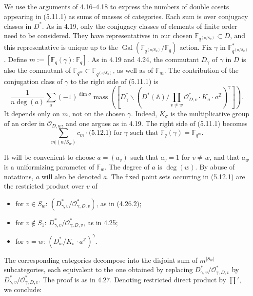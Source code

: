 \documentclass[11pt,a4paper]{article}
\theoremstyle{plain}
\theoremstyle{definition}
\DeclareMathOperator{\Gal}{Gal}
\DeclareMathOperator{\mass}{mass}
\newcommand{\Fq}{\mathbb{F}_q}
\newcommand{\F}{\mathbb{F}}
\newcommand{\Z}{\mathbb{Z}}
\begin{document}
\subsection{}
We use the arguments of 4.16--4.18 to express the numbers of double cosets appearing in (5.11.1) as sums of masses of categories. Each sum is over conjugacy classes in $D^*$. As in 4.19, only the conjugacy classes of elements of finite order need to be considered. They have representatives in our chosen $\F_{q^{(n/S_w)}} \subset D$, and this representative is unique up to the $\Gal(\F_{q^{(n/S_w)}}/\Fq)$ action. Fix $\gamma$ in $\F_{q^{(n/S_w)}}^*$. Define $m := [\F_q(\gamma) : \Fq]$. As in 4.19 and 4.24, the commutant $D_\gamma$ of $\gamma$ in $D$ is also the commutant of $\F_{q^m} \subset \F_{q^{(n/S_w)}}$, as well as of $\mathbb{F}_m$. The contribution of the conjugation class of $\gamma$ to the right side of (5.11.1) is
\begin{equation}
\frac{1}{n\deg(a)} \sum_\sigma (-1)^{\dim \sigma} \mass([D_\gamma^* \backslash (D^*(\mathbb{A}) / \prod_{v \neq w} \mathcal{O}_{D,v}^* \cdot K_\sigma \cdot a^{\Z})^\gamma]). \tag{5.12.1}
\end{equation}
It depends only on $m$, not on the chosen $\gamma$. Indeed, $K_\sigma$ is the multiplicative group of an order in $\mathcal{O}_{D,w}$, and one argues as in 4.19. The right side of (5.11.1) becomes
\begin{equation}
\sum_{m | (n/S_w)} c_m \cdot \text{(5.12.1) for $\gamma$ such that $\F_q(\gamma) = \F_{q^m}$}. \tag{5.12.2}
\end{equation}

It will be convenient to choose $a = (a_v)$ such that $a_v = 1$ for $v \neq w$, and that $a_w$ is a uniformizing parameter of $\mathbb{F}_w$. The degree of $a$ is $\deg(w)$. By abuse of notations, $a$ will also be denoted $a$. The fixed point sets occurring in (5.12.1) are the restricted product over $v$ of
\begin{itemize}
\item for $v \in S_w$: $(D_{\gamma,v}^*/\mathcal{O}_{\gamma,D,v}^*)$, as in (4.26.2);
\item for $v \notin S_1$: $D_{\gamma,v}^*/\mathcal{O}_{\gamma,D,v}^*$, as in 4.25;
\item for $v = w$: $(D_w^*/K_\sigma \cdot a^{\Z})^\gamma$.
\end{itemize}

The corresponding categories decompose into the disjoint sum of $m^{|S_w|}$ subcategories, each equivalent to the one obtained by replacing $D_{\gamma,v}^*/\mathcal{O}_{\gamma,D,v}^*$ by $D_{\gamma,v}^*/\mathcal{O}_{\gamma,D,v}^*$. The proof is as in 4.27. Denoting restricted direct product by $\prod'$, we conclude:
\end{document}

